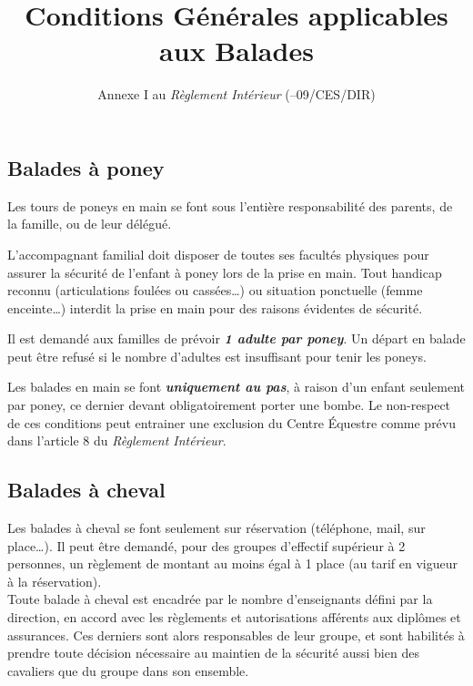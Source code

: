 \documentclass[11pt,a4paper]{article}
\title[Conditions Générales applicables aux Balades \\ version du \today]{Conditions Générales applicables aux Balades}
\subtitle{Annexe I au \textit{Règlement Intérieur} (\no 24--09/CES/DIR)}
\author{}
\date{}
\renewcommand{\emph}[1]{\textit{\textbf{#1}}}
\begin{document}
   \maketitle

   \vspace{-30pt}

   \subsection*{Balades à poney}
      Les tours de poneys en main se font sous l'entière responsabilité des parents, de la famille, ou de leur délégué.

      L'accompagnant familial doit disposer de toutes ses facultés physiques pour assurer la sécurité de l'enfant à poney lors de la prise en main.
      Tout handicap reconnu (articulations foulées ou cassées\dots) ou situation ponctuelle (femme enceinte\dots) interdit la prise en main pour des raisons évidentes de sécurité.

      Il est demandé aux familles de prévoir \emph{1 adulte par poney}.
      Un départ en balade peut être refusé si le nombre d'adultes est insuffisant pour tenir les poneys.

      Les balades en main se font \emph{uniquement au pas}, à raison d'un enfant seulement par poney, ce dernier devant obligatoirement porter une bombe.
      Le non-respect de ces conditions peut entrainer une exclusion du Centre Équestre comme prévu dans l'article 8 du \textit{Règlement Intérieur}.

   \subsection*{Balades à cheval}
      Les balades à cheval se font seulement sur réservation (téléphone, mail, sur place\dots).
      Il peut être demandé, pour des groupes d'effectif supérieur à 2 personnes, un règlement de montant au moins égal à 1 place (au tarif en vigueur à la réservation).
      \\

      Toute balade à cheval est encadrée par le nombre d'enseignants défini par la direction, en accord avec les règlements et autorisations afférents aux diplômes et assurances.
      Ces derniers sont alors responsables de leur groupe, et sont habilités à prendre toute décision nécessaire au maintien de la sécurité aussi bien des cavaliers que du groupe dans son ensemble.
      \\
\end{document}
